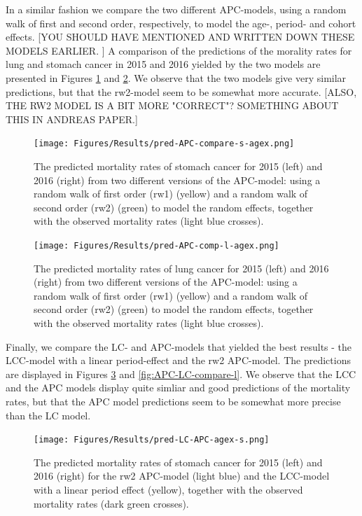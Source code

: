 In a similar fashion we compare the two different APC-models, using a random walk of first and second order, respectively, to model the age-, period- and cohort effects. [YOU SHOULD HAVE MENTIONED AND WRITTEN DOWN THESE MODELS EARLIER. ] A comparison of the predictions of the morality rates for lung and stomach cancer in 2015 and 2016 yielded by the two models are presented in Figures \ref{fig:APC-compare-s} and \ref{fig:APC-compare-l}. We observe that the two models give very similar predictions, but that the rw2-model seem to be somewhat more accurate. [ALSO, THE RW2 MODEL IS A BIT MORE "CORRECT"? SOMETHING ABOUT THIS IN ANDREAS PAPER.]  

\begin{figure}[h!]
    \centering
    \texttt{[image: Figures/Results/pred-APC-compare-s-agex.png]}
    \caption{The predicted mortality rates of stomach cancer for 2015 (left) and 2016 (right) from two different versions of the APC-model: using a random walk of first order (rw1) (yellow) and a random walk of second order (rw2) (green) to model the random effects, together with the observed mortality rates (light blue crosses).}
    \label{fig:APC-compare-s}
\end{figure}

\begin{figure}[h!]
    \centering
    \texttt{[image: Figures/Results/pred-APC-comp-l-agex.png]}
    \caption{The predicted mortality rates of lung cancer for 2015 (left) and 2016 (right) from two different versions of the APC-model: using a random walk of first order (rw1) (yellow) and a random walk of second order (rw2) (green) to model the random effects, together with the observed mortality rates (light blue crosses).}
    \label{fig:APC-compare-l}
\end{figure}

Finally, we compare the LC- and APC-models that yielded the best results - the LCC-model with a linear period-effect and the rw2 APC-model. The predictions are displayed in Figures \ref{fig:APC-LC-compare-s} and \ref{fig:APC-LC-compare-l}. We observe that the LCC and the APC models display quite simliar and good predictions of the mortality rates, but that the APC model predictions seem to be somewhat more precise than the LC model.

\begin{figure}[h!]
    \centering
    \texttt{[image: Figures/Results/pred-LC-APC-agex-s.png]}
    \caption{The predicted mortality rates of stomach cancer for 2015 (left) and 2016 (right) for the rw2 APC-model (light blue) and the LCC-model with a linear period effect (yellow), together with the observed mortality rates (dark green crosses).}
    \label{fig:APC-LC-compare-s}
\end{figure}

